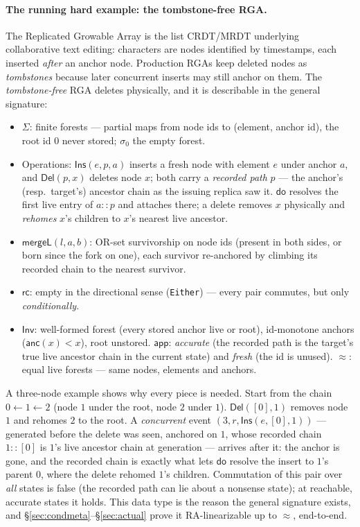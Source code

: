 \documentclass[11pt]{article}
\newcommand{\mergeL}{\mathsf{mergeL}}
\newcommand{\Sinit}{\sigma_0}
\newcommand{\lean}[1]{\texttt{#1}}
\newcommand{\anc}{\mathsf{anc}}
\newcommand{\eqobs}{\approx}
\newcommand{\Inv}{\mathsf{Inv}}
\newcommand{\app}{\mathsf{app}}
\begin{document}
\paragraph{The running hard example: the tombstone-free RGA.} The
Replicated Growable Array is the list CRDT/MRDT underlying collaborative
text editing: characters are nodes identified by timestamps, each
inserted \emph{after} an anchor node. Production RGAs keep deleted nodes
as \emph{tombstones} because later concurrent inserts may still anchor on
them. The \emph{tombstone-free} RGA deletes physically, and it is
describable in the general signature:
\begin{itemize}[leftmargin=2em,nosep]
\item $\Sigma$: finite forests --- partial maps from node ids to
  (element, anchor id), the root id $0$ never stored; $\Sinit$ the empty
  forest.
\item Operations: $\mathsf{Ins}(e, p, a)$ inserts a fresh node with
  element $e$ under anchor $a$, and $\mathsf{Del}(p, x)$ deletes node
  $x$; both carry a \emph{recorded path} $p$ --- the anchor's (resp.\
  target's) ancestor chain as the issuing replica saw it. $\mathsf{do}$
  resolves the first live entry of $a :: p$ and attaches there; a delete
  removes $x$ physically and \emph{rehomes} $x$'s children to $x$'s
  nearest live ancestor.
\item $\mergeL(l,a,b)$: OR-set survivorship on node ids (present in both
  sides, or born since the fork on one), each survivor re-anchored by
  climbing its recorded chain to the nearest survivor.
\item $\mathsf{rc}$: empty in the directional sense (\lean{Either}) ---
  every pair commutes, but only \emph{conditionally}.
\item $\Inv$: well-formed forest (every stored anchor live or root),
  id-monotone anchors ($\anc(x) < x$), root unstored. $\app$:
  \emph{accurate} (the recorded path is the target's true live ancestor
  chain in the current state) and \emph{fresh} (the id is unused).
  $\eqobs$: equal live forests --- same nodes, elements and anchors.
\end{itemize}
A three-node example shows why every piece is needed. Start from the
chain $0 \leftarrow 1 \leftarrow 2$ (node $1$ under the root, node $2$
under $1$). $\mathsf{Del}([0], 1)$ removes node $1$ and rehomes $2$ to
the root. A \emph{concurrent} event $(3, r, \mathsf{Ins}(e, [0], 1))$ ---
generated before the delete was seen, anchored on $1$, whose recorded
chain $1 :: [0]$ is $1$'s live ancestor chain at generation --- arrives
after it: the anchor is gone, and the recorded chain is exactly what lets
$\mathsf{do}$ resolve the insert to $1$'s parent $0$, where the delete
rehomed $1$'s children. Commutation of this pair over
\emph{all} states is false (the recorded path can lie about a nonsense
state); at reachable, accurate states it holds. This data type is the
reason the general signature exists, and
\S\ref{sec:condmeta}--\S\ref{sec:actual} prove it RA-linearizable up to
$\eqobs$, end-to-end.
\end{document}
